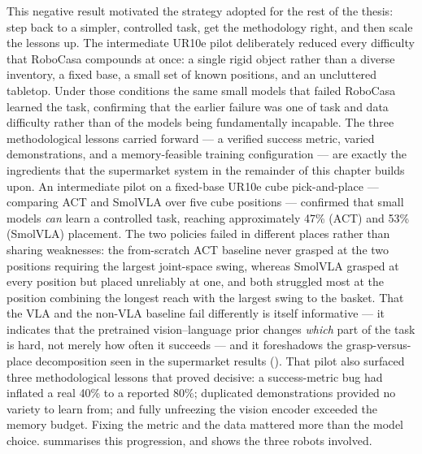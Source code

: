 This negative result motivated the strategy adopted for the rest of the thesis:
step back to a simpler, controlled task, get the methodology right, and then scale
the lessons up. The intermediate UR10e pilot deliberately reduced every difficulty
that RoboCasa compounds at once: a single rigid object rather than a diverse
inventory, a fixed base, a small set of known positions, and an uncluttered
tabletop. Under those conditions the same small models that failed RoboCasa learned
the task, confirming that the earlier failure was one of task and data difficulty
rather than of the models being fundamentally incapable. The three methodological
lessons carried forward --- a verified success metric, varied demonstrations, and a
memory-feasible training configuration --- are exactly the ingredients that the
supermarket system in the remainder of this chapter builds upon. An intermediate pilot on a fixed-base UR10e cube pick-and-place ---
comparing ACT and SmolVLA over five cube positions --- confirmed that small models
\emph{can} learn a controlled task, reaching approximately 47\% (ACT) and 53\%
(SmolVLA) placement. The two policies failed in different places rather than sharing
weaknesses: the from-scratch ACT baseline never grasped at the two positions requiring
the largest joint-space swing, whereas SmolVLA grasped at every position but placed
unreliably at one, and both struggled most at the position combining the longest reach
with the largest swing to the basket. That the VLA and the non-VLA baseline fail
differently is itself informative --- it indicates that the pretrained
vision--language prior changes \emph{which} part of the task is hard, not merely how
often it succeeds --- and it foreshadows the grasp-versus-place decomposition seen in
the supermarket results (). That pilot also surfaced three methodological lessons that
proved decisive: a success-metric bug had inflated a real 40\% to a reported 80\%;
duplicated demonstrations provided no variety to learn from; and fully unfreezing
the vision encoder exceeded the memory budget. Fixing the metric and the data
mattered more than the model choice.  summarises this
progression, and  shows the three robots involved.

